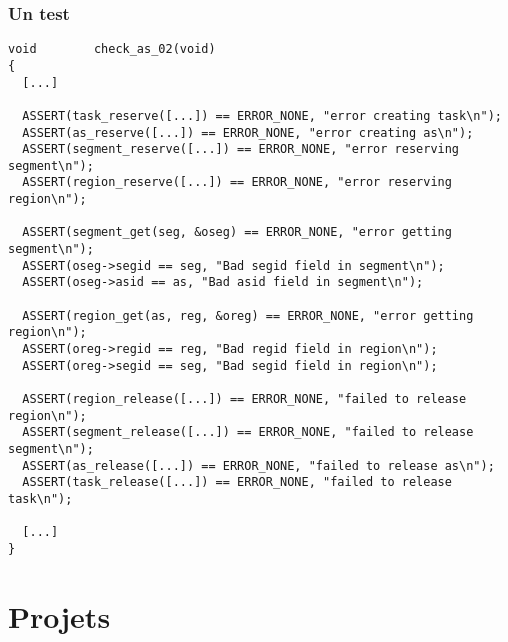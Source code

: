 \begin{frame}[containsverbatim]
  \frametitle{Un test}

  \begin{verbatim}
void		check_as_02(void)
{
  [...]

  ASSERT(task_reserve([...]) == ERROR_NONE, "error creating task\n");
  ASSERT(as_reserve([...]) == ERROR_NONE, "error creating as\n");
  ASSERT(segment_reserve([...]) == ERROR_NONE, "error reserving segment\n");
  ASSERT(region_reserve([...]) == ERROR_NONE, "error reserving region\n");

  ASSERT(segment_get(seg, &oseg) == ERROR_NONE, "error getting segment\n");
  ASSERT(oseg->segid == seg, "Bad segid field in segment\n");
  ASSERT(oseg->asid == as, "Bad asid field in segment\n");

  ASSERT(region_get(as, reg, &oreg) == ERROR_NONE, "error getting region\n");
  ASSERT(oreg->regid == reg, "Bad regid field in region\n");
  ASSERT(oreg->segid == seg, "Bad segid field in region\n");

  ASSERT(region_release([...]) == ERROR_NONE, "failed to release region\n");
  ASSERT(segment_release([...]) == ERROR_NONE, "failed to release segment\n");
  ASSERT(as_release([...]) == ERROR_NONE, "failed to release as\n");
  ASSERT(task_release([...]) == ERROR_NONE, "failed to release task\n");

  [...]
}
  \end{verbatim}

\end{frame}

%
%

\section{Projets}

